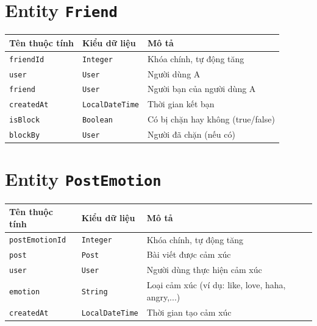 \section{Entity \texttt{Friend}}

\begin{longtable}{|>{\raggedright\arraybackslash}p{4cm}|>{\raggedright\arraybackslash}p{4cm}|>{\raggedright\arraybackslash}p{6cm}|}
\hline
\textbf{Tên thuộc tính} & \textbf{Kiểu dữ liệu} & \textbf{Mô tả} \\
\hline
\texttt{friendId} & \texttt{Integer} & Khóa chính, tự động tăng \\
\hline
\texttt{user} & \texttt{User} & Người dùng A \\
\hline
\texttt{friend} & \texttt{User} & Người bạn của người dùng A \\
\hline
\texttt{createdAt} & \texttt{LocalDateTime} & Thời gian kết bạn \\
\hline
\texttt{isBlock} & \texttt{Boolean} & Có bị chặn hay không (true/false) \\
\hline
\texttt{blockBy} & \texttt{User} & Người đã chặn (nếu có) \\
\hline
\end{longtable}

\section{Entity \texttt{PostEmotion}}

\begin{longtable}{|>{\raggedright\arraybackslash}p{4cm}|>{\raggedright\arraybackslash}p{4cm}|>{\raggedright\arraybackslash}p{6cm}|}
\hline
\textbf{Tên thuộc tính} & \textbf{Kiểu dữ liệu} & \textbf{Mô tả} \\
\hline
\texttt{postEmotionId} & \texttt{Integer} & Khóa chính, tự động tăng \\
\hline
\texttt{post} & \texttt{Post} & Bài viết được cảm xúc \\
\hline
\texttt{user} & \texttt{User} & Người dùng thực hiện cảm xúc \\
\hline
\texttt{emotion} & \texttt{String} & Loại cảm xúc (ví dụ: like, love, haha, angry,...) \\
\hline
\texttt{createdAt} & \texttt{LocalDateTime} & Thời gian tạo cảm xúc \\
\hline
\end{longtable}
